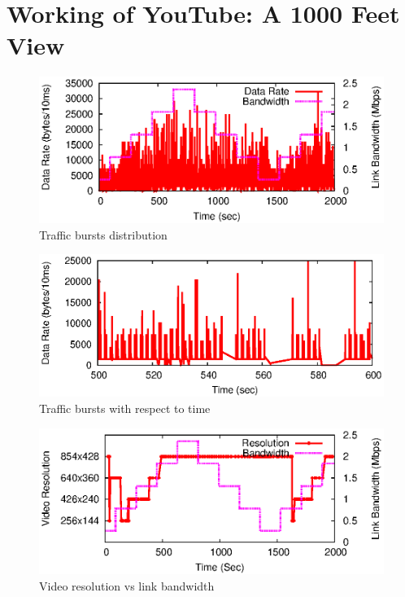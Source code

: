 \section{Working of YouTube: A 1000 Feet View}
\label{sec:overview}

\begin{figure}[!h]
	\centering
	\includegraphics[scale=0.85]{img/burst.eps}
	\caption{Traffic bursts distribution}
	\label{fig:packet}
\end{figure}

\begin{figure}[!h]
	\centering
	\includegraphics[scale=0.85]{img/burst_scale.eps}
	\caption{Traffic bursts with respect to time}
	\label{fig:burst}
\end{figure}

\begin{figure}[!h]
	\centering
	\includegraphics[scale=0.85]{img/bw_reso.eps}
	\caption{Video resolution vs link bandwidth}
	\label{fig:reso}
\end{figure}



